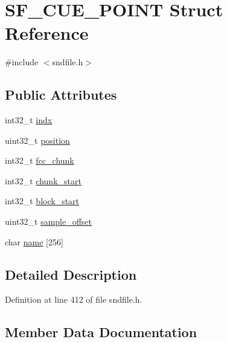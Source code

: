 \hypertarget{struct_s_f___c_u_e___p_o_i_n_t}{}\section{S\+F\+\_\+\+C\+U\+E\+\_\+\+P\+O\+I\+NT Struct Reference}
\label{struct_s_f___c_u_e___p_o_i_n_t}


{\ttfamily \#include $<$sndfile.\+h$>$}

\subsection*{Public Attributes}
\begin{DoxyCompactItemize}
\item 
int32\+\_\+t \mbox{\hyperlink{struct_s_f___c_u_e___p_o_i_n_t_a346aebc992e886ce24654d2190842d05}{indx}}
\item 
uint32\+\_\+t \mbox{\hyperlink{struct_s_f___c_u_e___p_o_i_n_t_af0a14e4da226c10b521028391a250dc7}{position}}
\item 
int32\+\_\+t \mbox{\hyperlink{struct_s_f___c_u_e___p_o_i_n_t_acc68b25045d7f945837d98cdfe9a4855}{fcc\+\_\+chunk}}
\item 
int32\+\_\+t \mbox{\hyperlink{struct_s_f___c_u_e___p_o_i_n_t_a9a582a14e020cf57dd9d3386c6a9ed27}{chunk\+\_\+start}}
\item 
int32\+\_\+t \mbox{\hyperlink{struct_s_f___c_u_e___p_o_i_n_t_a211926855aba739cd64e9486d8affbb4}{block\+\_\+start}}
\item 
uint32\+\_\+t \mbox{\hyperlink{struct_s_f___c_u_e___p_o_i_n_t_afa1b5db3843a2ad586e20d92bd18ae53}{sample\+\_\+offset}}
\item 
char \mbox{\hyperlink{struct_s_f___c_u_e___p_o_i_n_t_a3af76532a14733e8b2d7c2b0aa44f391}{name}} \mbox{[}256\mbox{]}
\end{DoxyCompactItemize}


\subsection{Detailed Description}


Definition at line 412 of file sndfile.\+h.



\subsection{Member Data Documentation}
\mbox{\label{struct_s_f___c_u_e___p_o_i_n_t_a211926855aba739cd64e9486d8affbb4}} 
